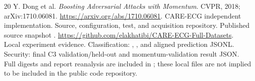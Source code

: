 \begin{thebibliography}{20}
 Y. Dong et al. \emph{Boosting Adversarial Attacks with Momentum}. CVPR, 2018; arXiv:1710.06081. \url{https://arxiv.org/abs/1710.06081}.
 CARE-ECG independent implementation. Source, configuration, test, and acquisition repository. Published source snapshot . \url{https://github.com/elakhatibi/CARE-ECG-Full-Datasets}.
 Local experiment evidence. Classification: , , and aligned prediction JSONL. Security: final C3 validation/held-out and momentum-validation result JSON. Full digests and report reanalysis are included in ; these local files are not implied to be included in the public code repository.
\end{thebibliography}
